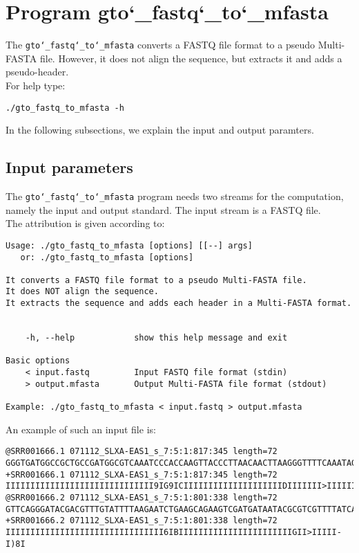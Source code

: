 \section{Program gto\char`_fastq\char`_to\char`_mfasta}
The \texttt{gto\char`_fastq\char`_to\char`_mfasta} converts a FASTQ file format to a pseudo Multi-FASTA file. However, it does not align the sequence, but extracts it and adds a pseudo-header.\\
For help type:
\begin{lstlisting}
./gto_fastq_to_mfasta -h
\end{lstlisting}
In the following subsections, we explain the input and output paramters.

\subsection*{Input parameters}

The \texttt{gto\char`_fastq\char`_to\char`_mfasta} program needs two streams for the computation, namely the input and output standard. The input stream is a FASTQ file.\\
The attribution is given according to:
\begin{lstlisting}
Usage: ./gto_fastq_to_mfasta [options] [[--] args]
   or: ./gto_fastq_to_mfasta [options]

It converts a FASTQ file format to a pseudo Multi-FASTA file.
It does NOT align the sequence.
It extracts the sequence and adds each header in a Multi-FASTA format.


    -h, --help            show this help message and exit

Basic options
    < input.fastq         Input FASTQ file format (stdin)
    > output.mfasta       Output Multi-FASTA file format (stdout)

Example: ./gto_fastq_to_mfasta < input.fastq > output.mfasta
\end{lstlisting}
An example of such an input file is:
\begin{lstlisting}
@SRR001666.1 071112_SLXA-EAS1_s_7:5:1:817:345 length=72
GGGTGATGGCCGCTGCCGATGGCGTCAAATCCCACCAAGTTACCCTTAACAACTTAAGGGTTTTCAAATAGA
+SRR001666.1 071112_SLXA-EAS1_s_7:5:1:817:345 length=72
IIIIIIIIIIIIIIIIIIIIIIIIIIIIII9IG9ICIIIIIIIIIIIIIIIIIIIIDIIIIIII>IIIIII/
@SRR001666.2 071112_SLXA-EAS1_s_7:5:1:801:338 length=72
GTTCAGGGATACGACGTTTGTATTTTAAGAATCTGAAGCAGAAGTCGATGATAATACGCGTCGTTTTATCAT
+SRR001666.2 071112_SLXA-EAS1_s_7:5:1:801:338 length=72
IIIIIIIIIIIIIIIIIIIIIIIIIIIIIIII6IBIIIIIIIIIIIIIIIIIIIIIIIGII>IIIII-I)8I
\end{lstlisting}

